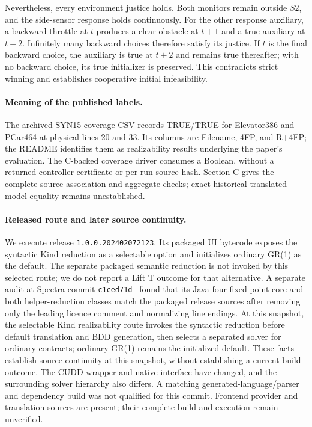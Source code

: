 \documentclass[11pt]{article}
\begin{document}
Nevertheless, every environment justice holds. Both monitors remain outside $S2$, and the side-sensor response holds continuously. For the other response auxiliary, a backward throttle at $t$ produces a clear obstacle at $t+1$ and a true auxiliary at $t+2$. Infinitely many backward choices therefore satisfy its justice. If $t$ is the final backward choice, the auxiliary is true at $t+2$ and remains true thereafter; with no backward choice, its true initializer is preserved. This contradicts strict winning and establishes cooperative initial infeasibility.


\paragraph{Meaning of the published labels.}
The archived SYN15 coverage CSV records TRUE/TRUE for Elevator386
and PCar464 at physical lines 20 and 33. Its columns are Filename,
4FP, and R+4FP; the README identifies them as realizability results
underlying the paper's evaluation. The C-backed coverage driver
consumes a Boolean, without a returned-controller certificate or
per-run source hash. Section C gives the complete source association
and aggregate checks; exact historical translated-model equality
remains unestablished.

\paragraph{Released route and later source continuity.}
We execute release \texttt{1.0.0.202402072123}.
Its packaged UI bytecode exposes the syntactic Kind reduction as a
selectable option and initializes ordinary GR(1) as the default.
The separate packaged semantic reduction is not invoked by this selected
route; we do not report a Lift T outcome for that alternative.
A separate audit at Spectra commit \texttt{c1ced71d}~\cite{spectrasnapshot}
found that its Java four-fixed-point core and both helper-reduction
classes match the packaged release sources after removing only the
leading licence comment and normalizing line endings.
At this snapshot, the selectable Kind realizability route invokes the syntactic reduction
before default translation and BDD generation, then selects a separated
solver for ordinary contracts; ordinary GR(1) remains the initialized
default. These facts establish source continuity at this snapshot,
without establishing a current-build outcome. The CUDD wrapper and
native interface have changed, and the surrounding solver hierarchy
also differs. A matching generated-language/parser and dependency build
was not qualified for this commit. Frontend provider and translation
sources are present; their complete build and execution remain unverified.
\end{document}
